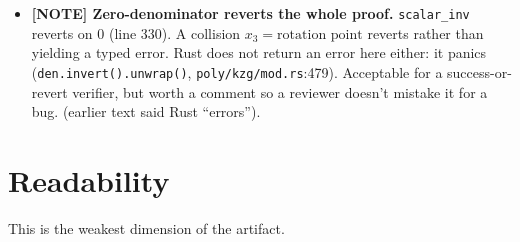 \begin{itemize}
        settings (via-IR) the runtime reserves $[\mathtt{0x80},\mathtt{0x8e0})$,
        overlapping the raw scratch that starts at \texttt{0x80}. See
        \S\ref{sec:pr-memorysafe} for this latent risk and
        \S\ref{sec:memory-safe} for the terminality argument.
         (earlier text said ``correct as emitted''.)
  \item \textcolor{mathpurple}{\textbf{[NOTE] Zero-denominator reverts
        the whole proof.}} \texttt{scalar\_inv} reverts on $0$
        (line 330). A collision $x_3 = \text{rotation point}$ reverts
        rather than yielding a typed error. Rust does not return an error
        here either: it panics (\texttt{den.invert().unwrap()},
        \texttt{poly/kzg/mod.rs}:479). Acceptable for a success-or-revert
        verifier, but worth a comment so a reviewer doesn't mistake it
        for a bug.  (earlier text said Rust ``errors'').
\end{itemize}

\section{Readability}
\label{sec:pr-read}

This is the weakest dimension of the artifact.

